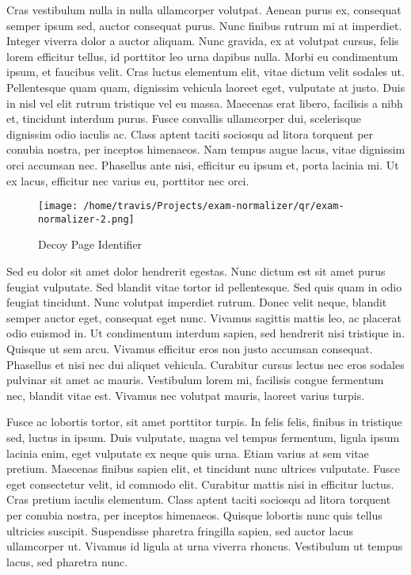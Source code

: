 \documentclass[12pt]{article}
\begin{document}
Cras vestibulum nulla in nulla ullamcorper volutpat. Aenean purus ex, consequat semper ipsum sed, auctor consequat purus. Nunc finibus rutrum mi at imperdiet. Integer viverra dolor a auctor aliquam. Nunc gravida, ex at volutpat cursus, felis lorem efficitur tellus, id porttitor leo urna dapibus nulla. Morbi eu condimentum ipsum, et faucibus velit. Cras luctus elementum elit, vitae dictum velit sodales ut. Pellentesque quam quam, dignissim vehicula laoreet eget, vulputate at justo. Duis in nisl vel elit rutrum tristique vel eu massa. Maecenas erat libero, facilisis a nibh et, tincidunt interdum purus. Fusce convallis ullamcorper dui, scelerisque dignissim odio iaculis ac. Class aptent taciti sociosqu ad litora torquent per conubia nostra, per inceptos himenaeos. Nam tempus augue lacus, vitae dignissim orci accumsan nec. Phasellus ante nisi, efficitur eu ipsum et, porta lacinia mi. Ut ex lacus, efficitur nec varius eu, porttitor nec orci.

\begin{figure}[htp]
\centering
\texttt{[image: /home/travis/Projects/exam-normalizer/qr/exam-normalizer-2.png]}
\caption{Decoy Page Identifier}
\label{}
\end{figure}

Sed eu dolor sit amet dolor hendrerit egestas. Nunc dictum est sit amet purus feugiat vulputate. Sed blandit vitae tortor id pellentesque. Sed quis quam in odio feugiat tincidunt. Nunc volutpat imperdiet rutrum. Donec velit neque, blandit semper auctor eget, consequat eget nunc. Vivamus sagittis mattis leo, ac placerat odio euismod in. Ut condimentum interdum sapien, sed hendrerit nisi tristique in. Quisque ut sem arcu. Vivamus efficitur eros non justo accumsan consequat. Phasellus et nisi nec dui aliquet vehicula. Curabitur cursus lectus nec eros sodales pulvinar sit amet ac mauris. Vestibulum lorem mi, facilisis congue fermentum nec, blandit vitae est. Vivamus nec volutpat mauris, laoreet varius turpis.

Fusce ac lobortis tortor, sit amet porttitor turpis. In felis felis, finibus in tristique sed, luctus in ipsum. Duis vulputate, magna vel tempus fermentum, ligula ipsum lacinia enim, eget vulputate ex neque quis urna. Etiam varius at sem vitae pretium. Maecenas finibus sapien elit, et tincidunt nunc ultrices vulputate. Fusce eget consectetur velit, id commodo elit. Curabitur mattis nisi in efficitur luctus. Cras pretium iaculis elementum. Class aptent taciti sociosqu ad litora torquent per conubia nostra, per inceptos himenaeos. Quisque lobortis nunc quis tellus ultricies suscipit. Suspendisse pharetra fringilla sapien, sed auctor lacus ullamcorper ut. Vivamus id ligula at urna viverra rhoncus. Vestibulum ut tempus lacus, sed pharetra nunc.
\end{document}
